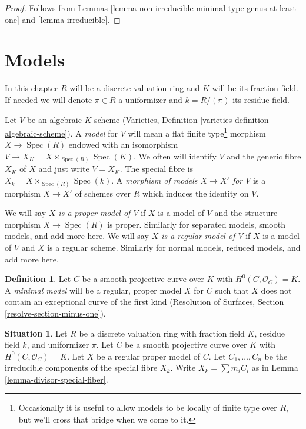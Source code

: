 \documentclass[10pt,a4paper]{amsart}
\theoremstyle{plain}
\theoremstyle{definition}
\newtheorem{definition}[subsection]{Definition}
\newtheorem{situation}[subsection]{Situation}
\theoremstyle{remark}
\numberwithin{equation}{subsection}
\def\Spec{\mathop{\mathrm{Spec}}}
\begin{document}
\begin{proof}
Follows from Lemmas \ref{lemma-non-irreducible-minimal-type-genus-at-least-one}
and \ref{lemma-irreducible}.
\end{proof}

\section{Models}
\label{section-models}

\noindent
In this chapter $R$ will be a discrete valuation ring and $K$ will
be its fraction field. If needed we will denote $\pi \in R$ a
uniformizer and $k = R/(\pi)$ its residue field.

\medskip\noindent
Let $V$ be an algebraic $K$-scheme
(Varieties, Definition \ref{varieties-definition-algebraic-scheme}).
A {\it model} for $V$ will
mean a flat finite type\footnote{Occasionally it is useful to
allow models to be locally of finite type over $R$, but we'll
cross that bridge when we come to it.}
morphism $X \to \Spec(R)$ endowed with
an isomorphism $V \to X_K = X \times_{\Spec(R)} \Spec(K)$. We often
will identify $V$ and the generic fibre $X_K$ of $X$ and
just write $V = X_K$.
The special fibre is $X_k = X \times_{\Spec(R)} \Spec(k)$.
A {\it morphism of models $X \to X'$ for $V$}
is a morphism $X \to X'$ of schemes over $R$ which induces
the identity on $V$.

\medskip\noindent
We will say {\it $X$ is a proper model of $V$} if $X$ is a model
of $V$ and the structure morphism $X \to \Spec(R)$ is proper.
Similarly for separated models, smooth models, and add more here.
We will say {\it $X$ is a regular model of $V$} if $X$ is a model
of $V$ and $X$ is a regular scheme.
Similarly for normal models, reduced models, and add more here.

\begin{definition}
\label{definition-minimal-model}
Let $C$ be a smooth projective curve over $K$ with
$H^0(C, \mathcal{O}_C) = K$. A {\it minimal model}
will be a regular, proper model $X$ for $C$ such that
$X$ does not contain an exceptional curve of the first kind
(Resolution of Surfaces, Section \ref{resolve-section-minus-one}).
\end{definition}

\begin{situation}
\label{situation-regular-model}
Let $R$ be a discrete valuation ring with fraction field $K$,
residue field $k$, and uniformizer $\pi$.
Let $C$ be a smooth projective curve over $K$ with $H^0(C, \mathcal{O}_C) = K$.
Let $X$ be a regular proper model of $C$.
Let $C_1, \ldots, C_n$ be the irreducible components of the special
fibre $X_k$. Write $X_k = \sum m_i C_i$ as in
Lemma \ref{lemma-divisor-special-fiber}.
\end{situation}
\end{document}
